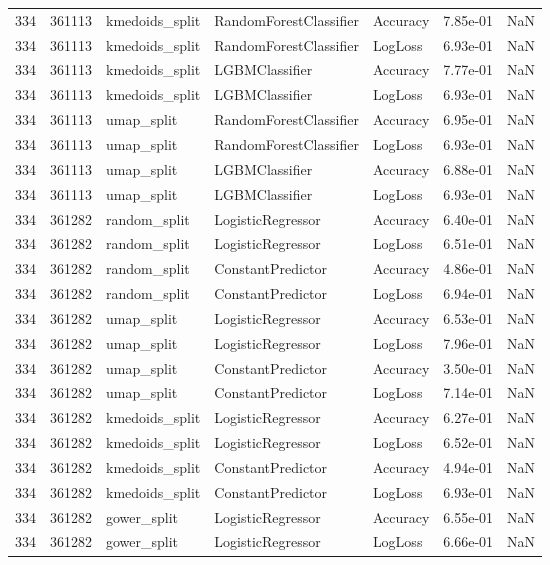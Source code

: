 \begin{tabular}{rrlllrr}
334 & 361113 & kmedoids\_split & RandomForestClassifier & Accuracy & 7.85e-01 & NaN \\
334 & 361113 & kmedoids\_split & RandomForestClassifier & LogLoss & 6.93e-01 & NaN \\
334 & 361113 & kmedoids\_split & LGBMClassifier & Accuracy & 7.77e-01 & NaN \\
334 & 361113 & kmedoids\_split & LGBMClassifier & LogLoss & 6.93e-01 & NaN \\
334 & 361113 & umap\_split & RandomForestClassifier & Accuracy & 6.95e-01 & NaN \\
334 & 361113 & umap\_split & RandomForestClassifier & LogLoss & 6.93e-01 & NaN \\
334 & 361113 & umap\_split & LGBMClassifier & Accuracy & 6.88e-01 & NaN \\
334 & 361113 & umap\_split & LGBMClassifier & LogLoss & 6.93e-01 & NaN \\
334 & 361282 & random\_split & LogisticRegressor & Accuracy & 6.40e-01 & NaN \\
334 & 361282 & random\_split & LogisticRegressor & LogLoss & 6.51e-01 & NaN \\
334 & 361282 & random\_split & ConstantPredictor & Accuracy & 4.86e-01 & NaN \\
334 & 361282 & random\_split & ConstantPredictor & LogLoss & 6.94e-01 & NaN \\
334 & 361282 & umap\_split & LogisticRegressor & Accuracy & 6.53e-01 & NaN \\
334 & 361282 & umap\_split & LogisticRegressor & LogLoss & 7.96e-01 & NaN \\
334 & 361282 & umap\_split & ConstantPredictor & Accuracy & 3.50e-01 & NaN \\
334 & 361282 & umap\_split & ConstantPredictor & LogLoss & 7.14e-01 & NaN \\
334 & 361282 & kmedoids\_split & LogisticRegressor & Accuracy & 6.27e-01 & NaN \\
334 & 361282 & kmedoids\_split & LogisticRegressor & LogLoss & 6.52e-01 & NaN \\
334 & 361282 & kmedoids\_split & ConstantPredictor & Accuracy & 4.94e-01 & NaN \\
334 & 361282 & kmedoids\_split & ConstantPredictor & LogLoss & 6.93e-01 & NaN \\
334 & 361282 & gower\_split & LogisticRegressor & Accuracy & 6.55e-01 & NaN \\
334 & 361282 & gower\_split & LogisticRegressor & LogLoss & 6.66e-01 & NaN \\

\end{tabular}

